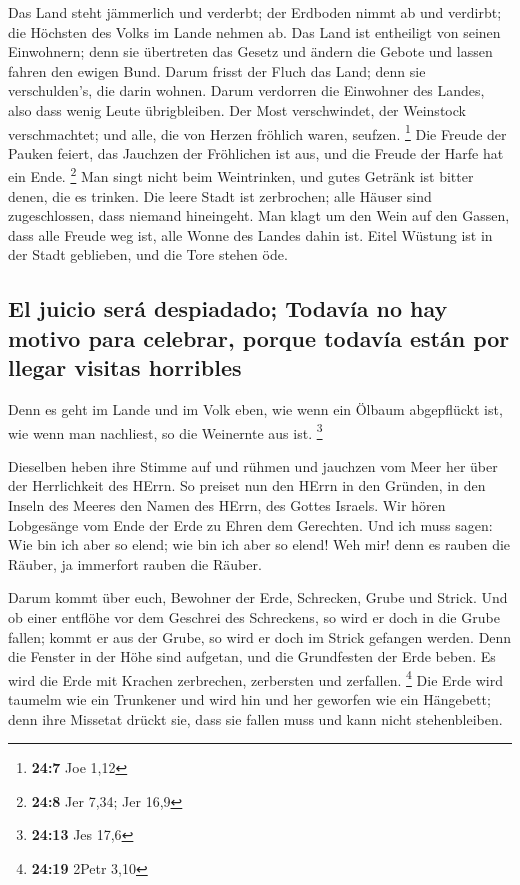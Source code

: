  Das Land steht jämmerlich und verderbt; der Erdboden
nimmt ab und verdirbt; die Höchsten des Volks im Lande nehmen ab.
 Das Land ist entheiligt von seinen Einwohnern; denn sie
übertreten das Gesetz und ändern die Gebote und lassen fahren den ewigen
Bund.  Darum frisst der Fluch das Land; denn sie
verschulden's, die darin wohnen. Darum verdorren die Einwohner des
Landes, also dass wenig Leute übrigbleiben.  Der Most
verschwindet, der Weinstock verschmachtet; und alle, die von Herzen
fröhlich waren, seufzen. \footnote{\textbf{24:7} Joe 1,12}
 Die Freude der Pauken feiert, das Jauchzen der Fröhlichen
ist aus, und die Freude der Harfe hat ein Ende. \footnote{\textbf{24:8}
  Jer 7,34; Jer 16,9}  Man singt nicht beim Weintrinken,
und gutes Getränk ist bitter denen, die es trinken.  Die
leere Stadt ist zerbrochen; alle Häuser sind zugeschlossen, dass niemand
hineingeht.  Man klagt um den Wein auf den Gassen, dass
alle Freude weg ist, alle Wonne des Landes dahin ist. 
Eitel Wüstung ist in der Stadt geblieben, und die Tore stehen öde.

\hypertarget{el-juicio-seruxe1-despiadado-todavuxeda-no-hay-motivo-para-celebrar-porque-todavuxeda-estuxe1n-por-llegar-visitas-horribles}{%
\subsection{El juicio será despiadado; Todavía no hay motivo para
celebrar, porque todavía están por llegar visitas
horribles}\label{el-juicio-seruxe1-despiadado-todavuxeda-no-hay-motivo-para-celebrar-porque-todavuxeda-estuxe1n-por-llegar-visitas-horribles}}

 Denn es geht im Lande und im Volk eben, wie wenn ein
Ölbaum abgepflückt ist, wie wenn man nachliest, so die Weinernte aus
ist. \footnote{\textbf{24:13} Jes 17,6}

 Dieselben heben ihre Stimme auf und rühmen und jauchzen
vom Meer her über der Herrlichkeit des HErrn.  So preiset
nun den HErrn in den Gründen, in den Inseln des Meeres den Namen des
HErrn, des Gottes Israels.  Wir hören Lobgesänge vom Ende
der Erde zu Ehren dem Gerechten. Und ich muss sagen: Wie bin ich aber so
elend; wie bin ich aber so elend! Weh mir! denn es rauben die Räuber, ja
immerfort rauben die Räuber.

 Darum kommt über euch, Bewohner der Erde, Schrecken,
Grube und Strick.  Und ob einer entflöhe vor dem Geschrei
des Schreckens, so wird er doch in die Grube fallen; kommt er aus der
Grube, so wird er doch im Strick gefangen werden. Denn die Fenster in
der Höhe sind aufgetan, und die Grundfesten der Erde beben.
 Es wird die Erde mit Krachen zerbrechen, zerbersten und
zerfallen. \footnote{\textbf{24:19} 2Petr 3,10}  Die Erde
wird taumelm wie ein Trunkener und wird hin und her geworfen wie ein
Hängebett; denn ihre Missetat drückt sie, dass sie fallen muss und kann
nicht stehenbleiben.

